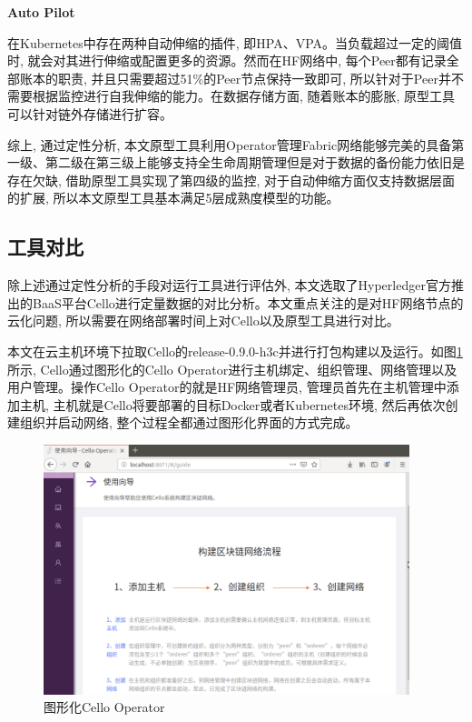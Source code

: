 \textbf{Auto Pilot}

在Kubernetes中存在两种自动伸缩的插件, 即HPA、VPA。当负载超过一定的阈值时, 就会对其进行伸缩或配置更多的资源。然而在HF网络中, 每个Peer都有记录全部账本的职责, 并且只需要超过51\%的Peer节点保持一致即可, 所以针对于Peer并不需要根据监控进行自我伸缩的能力。在数据存储方面, 随着账本的膨胀, 原型工具可以针对链外存储进行扩容。

综上, 通过定性分析, 本文原型工具利用Operator管理Fabric网络能够完美的具备第一级、第二级在第三级上能够支持全生命周期管理但是对于数据的备份能力依旧是存在欠缺, 借助原型工具实现了第四级的监控, 对于自动伸缩方面仅支持数据层面的扩展, 所以本文原型工具基本满足5层成熟度模型的功能。

\subsection{工具对比} \label{section: tool_comparison}

除上述通过定性分析的手段对运行工具进行评估外, 本文选取了Hyperledger官方推出的BaaS平台Cello进行定量数据的对比分析。本文重点关注的是对HF网络节点的云化问题, 所以需要在网络部署时间上对Cello以及原型工具进行对比。

本文在云主机环境下拉取Cello的release-0.9.0-h3c并进行打包构建以及运行。如图\ref{cello}所示, Cello通过图形化的Cello Operator进行主机绑定、组织管理、网络管理以及用户管理。操作Cello Operator的就是HF网络管理员, 管理员首先在主机管理中添加主机, 主机就是Cello将要部署的目标Docker或者Kubernetes环境, 然后再依次创建组织并启动网络, 整个过程全都通过图形化界面的方式完成。

\begin{figure}[h] %
    \centering %
    \includegraphics[width=0.95\textwidth]{FIGs/chapter5/cello.png} %
    \caption{图形化Cello Operator} %
    \label{cello} %
\end{figure}%

